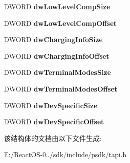 \begin{DoxyCompactItemize}
D\+W\+O\+RD {\bfseries dw\+Low\+Level\+Comp\+Size}
\item 
\mbox{\label{structlinecallinfo__tag_a39a661b4d3dd466d21e4e45e659cf802}} 
D\+W\+O\+RD {\bfseries dw\+Low\+Level\+Comp\+Offset}
\item 
\mbox{\label{structlinecallinfo__tag_a2979338cab00f1483bf5089d11bb8e2b}} 
D\+W\+O\+RD {\bfseries dw\+Charging\+Info\+Size}
\item 
\mbox{\label{structlinecallinfo__tag_a061ef46ab4c95ce28f2d472c86f5db4b}} 
D\+W\+O\+RD {\bfseries dw\+Charging\+Info\+Offset}
\item 
\mbox{\label{structlinecallinfo__tag_abb3f0f0a412fc430acd5e56659da9624}} 
D\+W\+O\+RD {\bfseries dw\+Terminal\+Modes\+Size}
\item 
\mbox{\label{structlinecallinfo__tag_a86085c05aada61a7a1f172440ff700cc}} 
D\+W\+O\+RD {\bfseries dw\+Terminal\+Modes\+Offset}
\item 
\mbox{\label{structlinecallinfo__tag_aa65f6845529e019ddaadb26d60e20056}} 
D\+W\+O\+RD {\bfseries dw\+Dev\+Specific\+Size}
\item 
\mbox{\label{structlinecallinfo__tag_a4378d768d5ae5a2c532523174df07e50}} 
D\+W\+O\+RD {\bfseries dw\+Dev\+Specific\+Offset}
\end{DoxyCompactItemize}


该结构体的文档由以下文件生成\+:\begin{DoxyCompactItemize}
\item 
E\+:/\+React\+O\+S-\/0../sdk/include/psdk/tapi.\+h\end{DoxyCompactItemize}
